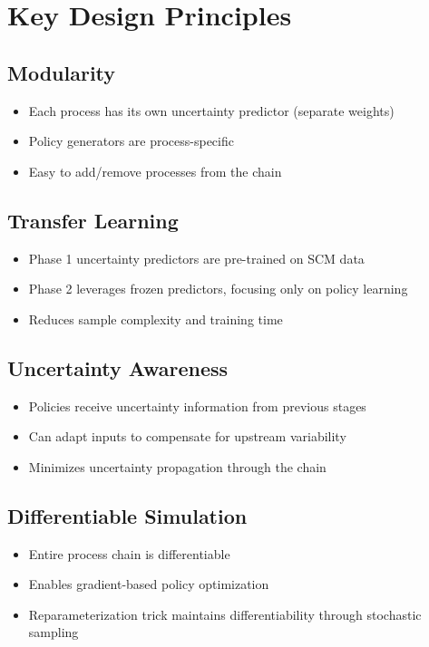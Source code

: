 \documentclass[11pt,a4paper]{article}
\begin{document}
\section{Key Design Principles}

\subsection{Modularity}
\begin{itemize}
    \item Each process has its own uncertainty predictor (separate weights)
    \item Policy generators are process-specific
    \item Easy to add/remove processes from the chain
\end{itemize}

\subsection{Transfer Learning}
\begin{itemize}
    \item Phase 1 uncertainty predictors are pre-trained on SCM data
    \item Phase 2 leverages frozen predictors, focusing only on policy learning
    \item Reduces sample complexity and training time
\end{itemize}

\subsection{Uncertainty Awareness}
\begin{itemize}
    \item Policies receive uncertainty information from previous stages
    \item Can adapt inputs to compensate for upstream variability
    \item Minimizes uncertainty propagation through the chain
\end{itemize}

\subsection{Differentiable Simulation}
\begin{itemize}
    \item Entire process chain is differentiable
    \item Enables gradient-based policy optimization
    \item Reparameterization trick maintains differentiability through stochastic sampling
\end{itemize}
\end{document}
